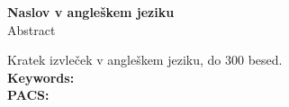 \cleardoublepage
\begin{center}
{\bf Naslov v angleškem jeziku}\\[3mm]
{\sc  Abstract}
\end{center}
\vspace{10mm}
Kratek izvleček v angleškem jeziku, do 300 besed.\\[10mm]
{\bf Keywords:}\\[3mm]
{\bf PACS:}


\cleardoublepage
\tableofcontents








